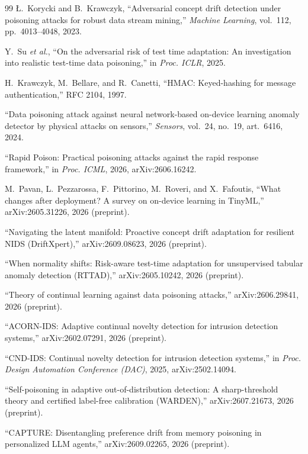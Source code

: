 \begin{thebibliography}{99}
 {\L}.~Korycki and B.~Krawczyk, ``Adversarial concept drift detection under poisoning
attacks for robust data stream mining,'' \emph{Machine Learning}, vol.~112, pp.~4013--4048, 2023.

 Y.~Su \emph{et al.}, ``On the adversarial risk of test time adaptation: An
investigation into realistic test-time data poisoning,'' in \emph{Proc. ICLR}, 2025.

 H.~Krawczyk, M.~Bellare, and R.~Canetti, ``HMAC: Keyed-hashing for message
authentication,'' RFC 2104, 1997.

 ``Data poisoning attack against neural network-based on-device learning anomaly
detector by physical attacks on sensors,'' \emph{Sensors}, vol.~24, no.~19, art.~6416, 2024.

 ``Rapid Poison: Practical poisoning attacks against the rapid response
framework,'' in \emph{Proc. ICML}, 2026, arXiv:2606.16242.

 M.~Pavan, L.~Pezzarossa, F.~Pittorino, M.~Roveri, and X.~Fafoutis, ``What changes after
deployment? A survey on on-device learning in TinyML,''
arXiv:2605.31226, 2026 (preprint).

 ``Navigating the latent manifold: Proactive concept drift adaptation for resilient
NIDS (DriftXpert),'' arXiv:2609.08623, 2026 (preprint).

 ``When normality shifts: Risk-aware test-time adaptation for unsupervised tabular
anomaly detection (RTTAD),'' arXiv:2605.10242, 2026 (preprint).

 ``Theory of continual learning against data poisoning attacks,'' arXiv:2606.29841,
2026 (preprint).

 ``ACORN-IDS: Adaptive continual novelty detection for intrusion detection systems,''
arXiv:2602.07291, 2026 (preprint).

 ``CND-IDS: Continual novelty detection for intrusion detection systems,'' in
\emph{Proc. Design Automation Conference (DAC)}, 2025, arXiv:2502.14094.

 ``Self-poisoning in adaptive out-of-distribution detection: A sharp-threshold theory
and certified label-free calibration (WARDEN),'' arXiv:2607.21673, 2026 (preprint).

 ``CAPTURE: Disentangling preference drift from memory poisoning in personalized LLM
agents,'' arXiv:2609.02265, 2026 (preprint).


\end{thebibliography}
